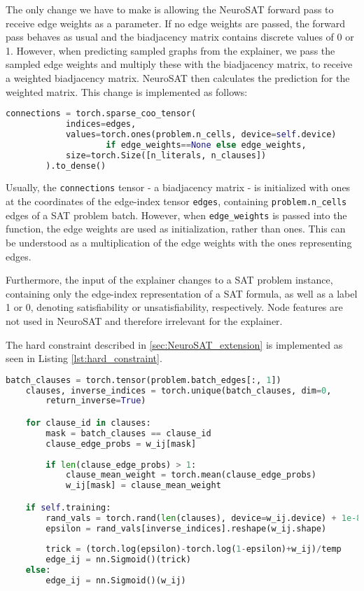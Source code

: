 The only change we have to make is allowing the NeuroSAT forward pass to receive edge weights as a parameter. If no edge weights are passed, the forward pass behaves as usual and the biadjacency matrix contains discrete values of 0 or 1. However, when predicting sampled graphs from the explainer, we pass the sampled edge weights and multiply these with the biadjacency matrix, to receive a weighted biadjacency matrix. NeuroSAT then calculates the prediction for the weighted matrix. This change is implemented as follows:
\begin{lstlisting}[language=Python, caption=Adaptation of NeuroSAT, label=lst:NeuroSAT_adaptation]
    connections = torch.sparse_coo_tensor(
            indices=edges,
            values=torch.ones(problem.n_cells, device=self.device) 
                    if edge_weights==None else edge_weights,
            size=torch.Size([n_literals, n_clauses])
        ).to_dense()
\end{lstlisting}
Usually, the \lstinline|connections| tensor - a biadjacency matrix - is initialized with ones at the coordinates of the edge-index tensor \lstinline|edges|, containing \lstinline|problem.n_cells| edges of a SAT problem batch. However, when \lstinline|edge_weights| is passed into the function, the edge weights are used as initialization, rather than ones. This can be understood as a multiplication of the edge weights with the ones representing edges.

Furthermore, the input of the explainer changes to a SAT problem instance, containing only the edge-index representation of a SAT formula, as well as a label 1 or 0, denoting satisfiability or unsatisfiability, respectively. Node features are not used in NeuroSAT and therefore irrelevant for the explainer. \bigskip

The hard constraint described in \ref{sec:NeuroSAT_extension} is implemented as seen in Listing \ref{lst:hard_constraint}.

\begin{lstlisting}[language=Python, caption=Implementation of Hard Constraint, label=lst:hard_constraint]
    batch_clauses = torch.tensor(problem.batch_edges[:, 1])
    clauses, inverse_indices = torch.unique(batch_clauses, dim=0, 
        return_inverse=True)

    for clause_id in clauses:
        mask = batch_clauses == clause_id
        clause_edge_probs = w_ij[mask]
        
        if len(clause_edge_probs) > 1:
            clause_mean_weight = torch.mean(clause_edge_probs)
            w_ij[mask] = clause_mean_weight

    if self.training:
        rand_vals = torch.rand(len(clauses), device=w_ij.device) + 1e-8
        epsilon = rand_vals[inverse_indices].reshape(w_ij.shape)
        
        trick = (torch.log(epsilon)-torch.log(1-epsilon)+w_ij)/temp
        edge_ij = nn.Sigmoid()(trick)    
    else:
        edge_ij = nn.Sigmoid()(w_ij)
\end{lstlisting}

